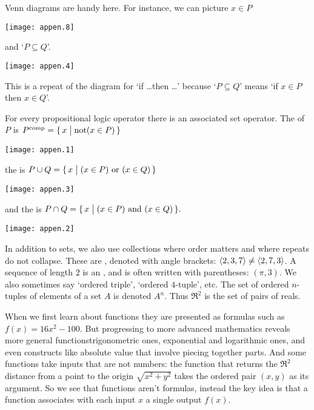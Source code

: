 Venn diagrams are handy here.
For instance, we can picture \( x\in P \) 
\begin{center}
  \texttt{[image: appen.8]}
\end{center}
and `\( P\subseteq Q \)'.
\begin{center}
  \texttt{[image: appen.4]}
\end{center}
\noindent
This is a repeat of the diagram for `if \ldots then \ldots' 
because `\( P\subseteq Q \)' means 
`if \( x\in P \) then \( x\in Q \)'.

For every propositional logic operator there is an associated set
operator.
The 
of \( P \) is
\( P^{\text{comp}}=\mbox{$\{\,x\bigm| \text{not$( x\in P)$}\,\}$} \)
\begin{center}
  \texttt{[image: appen.1]}
\end{center}
\noindent
the  is
\( P\cup Q=\mbox{$\{\,x\bigm| \text{$(x\in P)$ or $(x\in Q)$}\,\}$} \)
\begin{center}
  \texttt{[image: appen.3]}
\end{center}
and the  is
\( P\cap Q=\mbox{$\{\,x\bigm| \text{$(x\in P)$ and $(x\in Q)$}\,\}$}. \)
\begin{center}
  \texttt{[image: appen.2]}
\end{center}



In addition to sets,
we also use collections where order matters and where repeats do
not collapse.
These are , denoted with angle brackets:
\( \langle 2,3,7\rangle\neq\langle2,7,3\rangle \).
A sequence of length \( 2 \) is an 
,
and is often written with parentheses: \( (\pi,3) \).
We also sometimes say `ordered triple', `ordered \( 4 \)-tuple', etc.
The set of ordered \( n \)-tuples of elements of a set \( A \) is denoted
\( A^n \).
Thus \( \Re^2 \) is the set of pairs of reals.




When we first learn about functions they are
presented as formulas such as \( f(x)=16x^2-100 \).
But progressing to more advanced mathematics reveals more general
functions\Dash trigonometric ones, exponential and
logarithmic ones, and even constructs like absolute value that involve
piecing together parts. 
And some functions take inputs that are not numbers:
the function that returns the $\Re^2$ distance from a point to the origin 
\( \sqrt{x^2+y^2} \)
takes the ordered pair \( (x,y) \) as its argument.
So we see that functions aren't
formulas, instead the key idea is that a function associates with each
input \( x \) a single output \( f(x) \).

